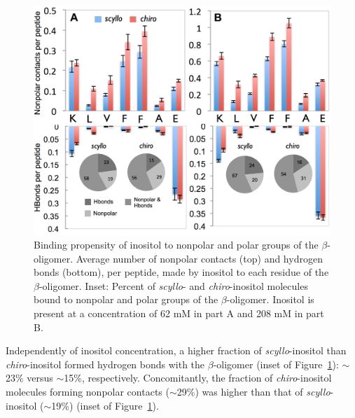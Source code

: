 \begin{figure}
\centering
\includegraphics[width=15cm]{figures/results2/inos2_figures_beta_residues_revised.pdf}
\caption[Binding propensity of inositol to nonpolar and polar groups of the $\beta$-oligomer]{Binding propensity of inositol to nonpolar and polar groups of the $\beta$-oligomer. Average number of nonpolar contacts (top) and hydrogen bonds (bottom), per peptide, made by inositol to each residue of the $\beta$-oligomer. Inset: Percent of \emph{scyllo}- and \emph{chiro}-inositol molecules bound to nonpolar and polar groups of the $\beta$-oligomer.  Inositol is present at a concentration of 62 mM in part A and 208 mM in part B.}
\label{fig:beta_residue_binding}
\end{figure}

Independently of inositol concentration, a higher fraction of \emph{scyllo}-inositol than \emph{chiro}-inositol formed hydrogen bonds with the $\beta$-oligomer (inset of Figure~\ref{fig:beta_residue_binding}): %
$\sim$23\% versus $\sim$15\%, respectively. Concomitantly, the fraction of \emph{chiro}-inositol molecules forming nonpolar contacts ($\sim$29\%) was higher than that of \emph{scyllo}-inositol ($\sim$19\%) (inset of Figure~\ref{fig:beta_residue_binding}). %

